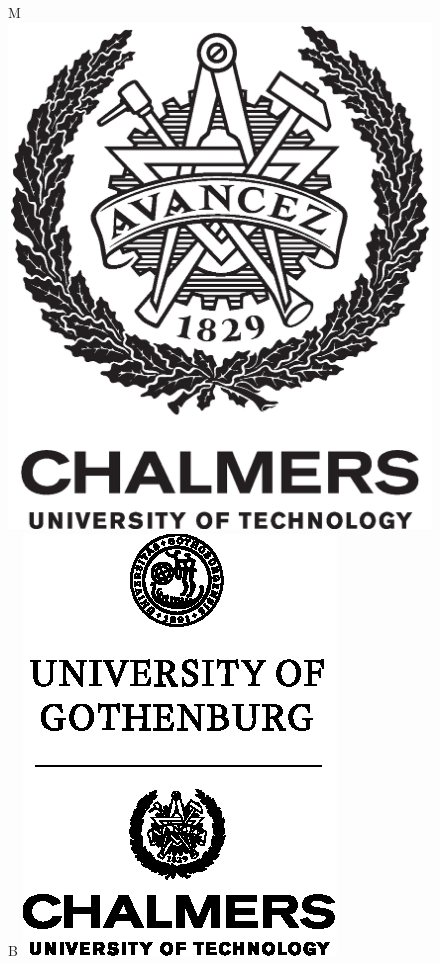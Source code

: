 \begin{center}
	\vfill	
	\begin{figure}[H]
	\centering
	\if\ThesisType M
    \includegraphics[width=0.2\pdfpagewidth]{figure/auxiliary/AvancezChalmersU_black_centered.eps} \\
    \fi
    \if\ThesisType B
    \includegraphics[width=0.23\pdfpagewidth]{figure/auxiliary/cth_uog_logo.eps} \\
    \fi
	\end{figure}	\vspace{5mm}	
	

\end{center}
